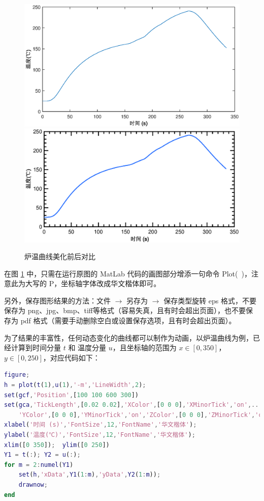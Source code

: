 \documentclass[12pt,utf8]{article}
\begin{document}
\begin{figure}[hb]
\centering
\includegraphics[width=0.85\linewidth]{./figures/OrigFig}
\includegraphics[width=0.85\linewidth]{./figures/BiuFig}
\caption{炉温曲线美化前后对比}
\label{fig:origfig}
\end{figure}

在图 \ref{fig:origfig} 中，只需在运行原图的 MatLab 代码的画图部分增添一句命令 Plot(~)，注意此为大写的 P，坐标轴字体改成华文楷体即可。

另外，保存图形结果的方法：文件 $ \rightarrow $ 另存为 $ \rightarrow $ 保存类型旋转 eps 格式，不要保存为 png、jpg、bmp、tiff等格式（容易失真，且有时会超出页面），也不要保存为 pdf 格式（需要手动删除空白或设置保存选项，且有时会超出页面）。

为了结果的丰富性，任何动态变化的曲线都可以制作为动画，以炉温曲线为例，已经计算到时间分量 $t$ 和 温度分量 $u$，且坐标轴的范围为 $x\in[0, 350]$，$y\in[0, 250]$，对应代码如下：

\begin{lstlisting}[language=matlab]
figure;
h = plot(t(1),u(1),'-m','LineWidth',2);
set(gcf,'Position',[100 100 600 300])
set(gca,'TickLength',[0.02 0.02],'XColor',[0 0 0],'XMinorTick','on',...
    'YColor',[0 0 0],'YMinorTick','on','ZColor',[0 0 0],'ZMinorTick','on');
xlabel('时间 (s)','FontSize',12,'FontName','华文楷体');
ylabel('温度(℃)','FontSize',12,'FontName','华文楷体');
xlim([0 350]);  ylim([0 250])
Y1 = t(:); Y2 = u(:);
for m = 2:numel(Y1)
    set(h,'xData',Y1(1:m),'yData',Y2(1:m));
    drawnow;
end
\end{lstlisting}
\end{document}
